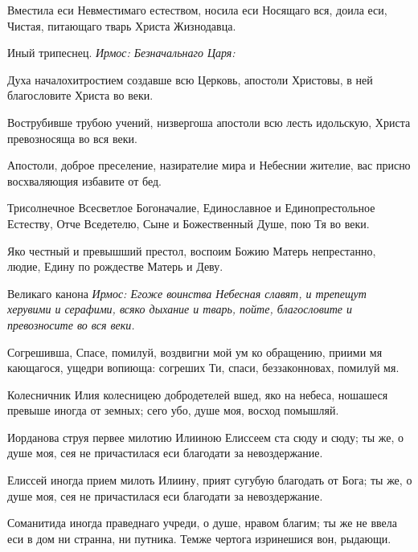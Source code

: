Вместила еси Невместимаго естеством, носила еси Носящаго вся, доила еси, Чистая, питающаго тварь Христа Жизнодавца.


Иный трипеснец. \itshape Ирмос\normalfont{}: Безначальнаго Царя:




Духа началохитростием создавше всю Церковь, апостоли Христовы, в ней благословите Христа во веки.




Вострубивше трубою учений, низвергоша апостоли всю лесть идольскую, Христа превозносяща во вся веки.




Апостоли, доброе преселение, назирателие мира и Небеснии жителие, вас присно восхваляющия избавите от бед.




Трисолнечное Всесветлое Богоначалие, Единославное и Единопрестольное Естеству, Отче Вседетелю, Сыне и Божественный Душе, пою Тя во веки.




Яко честный и превышший престол, воспоим Божию Матерь непрестанно, людие, Едину по рождестве Матерь и Деву.


Великаго канона \itshape Ирмос\normalfont{}: Егоже воинства Небесная славят, и трепещут херувими и серафими, всяко дыхание и тварь, пойте, благословите и превозносите во вся веки.


Согрешивша, Спасе, помилуй, воздвигни мой ум ко обращению, приими мя кающагося, ущедри вопиюща: согреших Ти, спаси, беззаконновах, помилуй мя.


Колесничник Илия колесницею добродетелей вшед, яко на небеса, ношашеся превыше иногда от земных; сего убо, душе моя, восход помышляй.

Иорданова струя первее милотию Илииною Елиссеем ста сюду и сюду; ты же, о душе моя, сея не причастилася еси благодати за невоздержание.


Елиссей иногда прием милоть Илиину, прият сугубую благодать от Бога; ты же, о душе моя, сея не причастилася еси благодати за невоздержание.


Соманитида иногда праведнаго учреди, о душе, нравом благим; ты же не ввела еси в дом ни странна, ни путника. Темже чертога изринешися вон, рыдающи.


